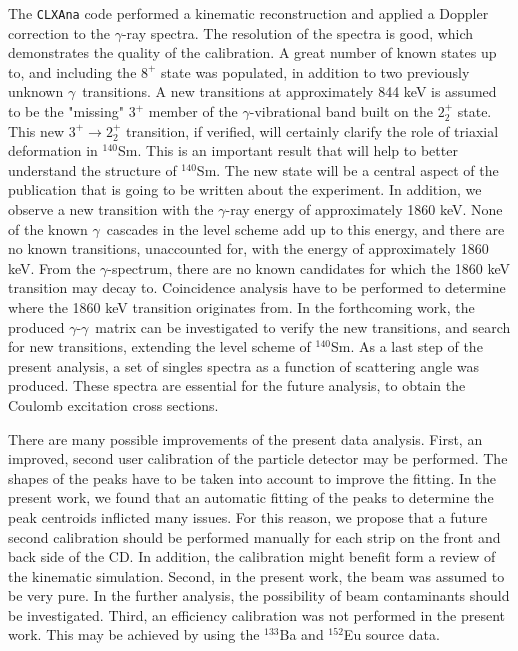 \documentclass[twoside,english]{uiofysmaster/uiofysmaster}
\newcommand{\Sm}{$^{140}$Sm} %
\newcommand{\ga}{$\gamma$}
\begin{document}
The \texttt{CLXAna} code performed a kinematic reconstruction and applied a Doppler correction to the \ga-ray spectra.
The resolution of the spectra is good, which demonstrates the quality of the calibration.
A great number of known states up to, and including the $8^+$ state was populated, in addition to two previously unknown \ga\ transitions. 
A new transitions at approximately 844 keV is assumed to be the "missing" $3^+$ member of the \ga-vibrational band built on the $2_2^+$ state. 
This new $3^+ \rightarrow 2_2^+$ transition, if verified, will certainly clarify the role of triaxial deformation in \Sm.
This is an important result that will help to better understand the structure of \Sm. 
The new state will be a central aspect of the publication that is going to be written about the experiment.
In addition, we observe a new transition with the \ga-ray energy of approximately 1860 keV. 
None of the known \ga\ cascades in the level scheme add up to this energy, and there are no known transitions, unaccounted for, with the energy of approximately 1860 keV. 
From the \ga-spectrum, there are no known candidates for which the 1860 keV transition may decay to.
Coincidence analysis have to be performed to determine where the 1860 keV transition originates from.
In the forthcoming work, the produced \ga-\ga\ matrix can be investigated to verify the new transitions, and search for new transitions, extending the level scheme of \Sm. 
As a last step of the present analysis, a set of singles spectra as a function of scattering angle was produced. These spectra are essential for the future analysis, to obtain the Coulomb excitation cross sections. 

There are many possible improvements of the present data analysis. 
First, an improved, second user calibration of the particle detector may be performed. 
The shapes of the peaks have to be taken into account to improve the fitting. 
In the present work, we found that an automatic fitting of the peaks to determine the peak centroids inflicted many issues. 
For this reason, we propose that a future second calibration should be performed manually for each strip on the front and back side of the CD. 
In addition, the calibration might benefit form a review of the kinematic simulation.
Second, in the present work, the beam was assumed to be very pure. 
In the further analysis, the possibility of beam contaminants should be investigated.
Third, an efficiency calibration was not performed in the present work. 
This may be achieved by using the $^{133}$Ba and $^{152}$Eu source data.
\end{document}
